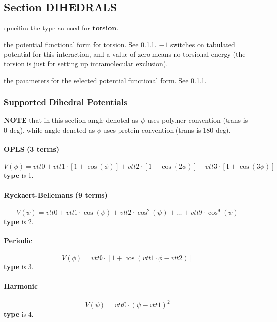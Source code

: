 \documentclass[12pt,letterpaper]{article}
\begin{document}
\subsection{Section \textbf{DIHEDRALS}}
\label{dihedrals}
 specifies the type as used for {\bf
  torsion}.

 the potential functional form for
torsion. See \ref{torsion}. $-1$ switches on tabulated
potential for this interaction, and a value of zero means no
torsional energy (the torsion is just for setting up
intramolecular exclusion).

 the parameters for the selected
potential functional form. See \ref{torsion}.

\subsubsection{Supported Dihedral Potentials}
\label{torsion}
{\bf NOTE} that in this section angle denoted as $\psi$ uses
polymer convention (trans is 0 deg), while angle denoted as
$\phi$ uses protein convention (trans is 180 deg).

\paragraph{OPLS (3 terms)}
\begin{equation}
V(\phi) = vtt0 + vtt1\cdot[1+\cos(\phi)] + vtt2\cdot[1-\cos(2\phi)]
+ vtt3\cdot[1+\cos(3\phi)]
\end{equation}
{\bf type} is 1.

\paragraph{Ryckaert-Bellemans (9 terms)}
\begin{equation}
V(\psi) = vtt0 + vtt1\cdot\cos(\psi) + vtt2\cdot\cos^2(\psi) + \dots + vtt9\cdot\cos^9(\psi)
\end{equation}
{\bf type} is 2.

\paragraph{Periodic}
\begin{equation}
V(\phi) = vtt0\cdot[1+\cos(vtt1\cdot\phi-vtt2)]
\end{equation}
{\bf type} is 3.

\paragraph{Harmonic}
\begin{equation}
V(\psi) = vtt0\cdot(\psi-vtt1)^2
\end{equation}
{\bf type} is 4.
\end{document}
